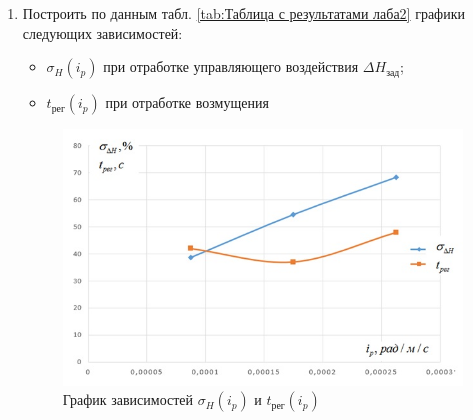 \documentclass[a4paper,12pt]{article}
\begin{document}
\begin{enumerate}
                            
                        \item Построить по данным табл. \ref{tab:Таблица с результатами лаба2} графики следующих зависимостей:
                            \begin{itemize}
                                \item  $\sigma_{H}(i_p)$ при отработке управляющего воздействия $\Delta H_{\text{зад}}$;
                                \item  $t_{\text{рег}}(i_p)$  при отработке возмущения
                            \end{itemize}
                            \begin{figure}[H]
                                \centering
                                \includegraphics[widht=\linewidth]{img/10.jpg}
                                \caption{График зависимостей $\sigma_{H}(i_p)$ и $t_{\text{рег}}(i_p)$ }
                                \label{fig:my_label}
                            \end{figure}
                            

\end{enumerate}
\end{document}
